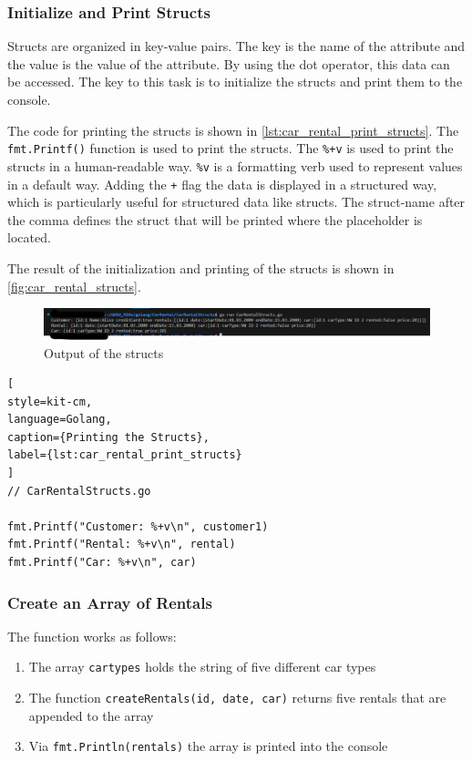 \subsubsection*{Initialize and Print Structs}
Structs are organized in key-value pairs.
The key is the name of the attribute and the value is the value of the attribute.
By using the dot operator, this data can be accessed.
The key to this task is to initialize the structs and print them to the console.

The code for printing the structs is shown in \autoref{lst:car_rental_print_structs}.
The \texttt{fmt.Printf()} function is used to print the structs.
The \texttt{\%+v} is used to print the structs in a human-readable way.
\texttt{\%v} is a formatting verb used to represent values in a default way.
Adding the \texttt{+} flag the data is displayed in a structured way, which is particularly useful for structured data like structs.
The struct-name after the comma defines the struct that will be printed where the placeholder is located.

The result of the initialization and printing of the structs is shown in \autoref{fig:car_rental_structs}.
\begin{figure}[H]
    \centering
    \includegraphics[width=\textwidth]{figures/goLang/carRental/carRental_structs.png}
    \caption{Output of the structs}
    \label{fig:car_rental_structs}
\end{figure}

\begin{lstlisting}[
style=kit-cm,
language=Golang,
caption={Printing the Structs},
label={lst:car_rental_print_structs}
]
// CarRentalStructs.go

fmt.Printf("Customer: %+v\n", customer1)
fmt.Printf("Rental: %+v\n", rental)
fmt.Printf("Car: %+v\n", car)
\end{lstlisting}

\subsubsection*{Create an Array of Rentals}
The function works as follows:
\begin{enumerate}
    \item The array \texttt{cartypes} holds the string of five different car types
    \item The function \texttt{createRentals(id, date, car)} returns five rentals that are appended to the array
    \item Via \texttt{fmt.Println(rentals)} the array is printed into the console
\end{enumerate}

